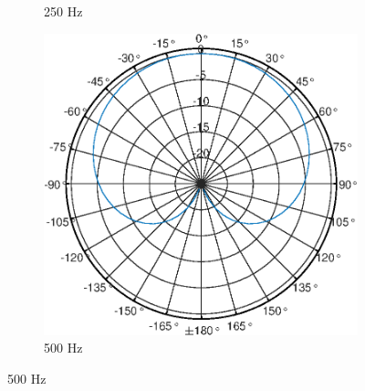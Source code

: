 \begin{figure}[b]
\begin{subfigure}{.33\textwidth}
        \caption{250 Hz}
        \label{fig:Polar_250}
    \end{subfigure}
    \begin{subfigure}{.33\textwidth}
        \centering
        \includegraphics[width=0.95\linewidth]{Figures/KM184_500Hz}
        \caption{500 Hz}
        \label{fig:Polar_500}
    \end{subfigure}
\end{figure}

